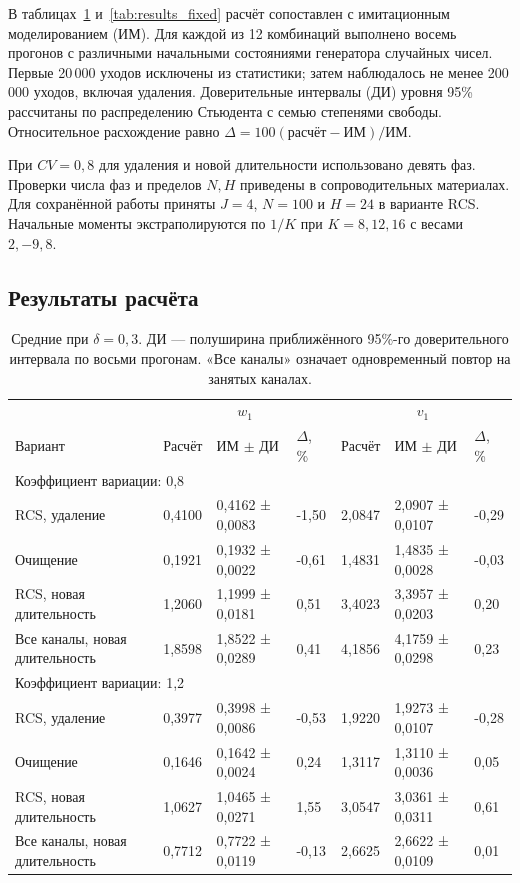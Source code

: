 \documentclass[a4paper,12pt]{article}
\begin{document}
В таблицах~\ref{tab:results} и~\ref{tab:results_fixed} расчёт сопоставлен с имитационным моделированием (ИМ). Для каждой из 12 комбинаций выполнено восемь прогонов с различными начальными состояниями генератора случайных чисел. Первые 20\,000 уходов исключены из статистики; затем наблюдалось не менее 200\,000 уходов, включая удаления. Доверительные интервалы (ДИ) уровня 95\% рассчитаны по распределению Стьюдента с семью степенями свободы. Относительное расхождение равно \(\Delta=100(\text{расчёт}-\text{ИМ})/\text{ИМ}\).

При \(CV=0{,}8\) для удаления и новой длительности использовано девять фаз. Проверки числа фаз и пределов \(N,H\) приведены в сопроводительных материалах. Для сохранённой работы приняты \(J=4\), \(N=100\) и \(H=24\) в варианте RCS. Начальные моменты экстраполируются по \(1/K\) при \(K=8,12,16\) с весами \(2,-9,8\).

\subsection{Результаты расчёта}
\begin{table}[!htbp]
\centering\small\setlength{\tabcolsep}{2pt}
\begin{tabular}{@{}p{4.16cm}p{1.61cm}p{2.83cm}p{1.28cm}p{1.61cm}p{2.83cm}p{1.28cm}@{}}
\toprule
 & \multicolumn{3}{c}{$w_1$} & \multicolumn{3}{c}{$v_1$} \\
Вариант & Расчёт & ИМ $\pm$ ДИ & $\Delta$, \% & Расчёт & ИМ $\pm$ ДИ & $\Delta$, \% \\
\midrule
\multicolumn{7}{l}{Коэффициент вариации: 0,8} \\
RCS, удаление & 0,4100 & 0,4162 ± 0,0083 & -1,50 & 2,0847 & 2,0907 ± 0,0107 & -0,29 \\
Очищение & 0,1921 & 0,1932 ± 0,0022 & -0,61 & 1,4831 & 1,4835 ± 0,0028 & -0,03 \\
RCS, новая длительность & 1,2060 & 1,1999 ± 0,0181 & 0,51 & 3,4023 & 3,3957 ± 0,0203 & 0,20 \\
Все каналы, новая длительность & 1,8598 & 1,8522 ± 0,0289 & 0,41 & 4,1856 & 4,1759 ± 0,0298 & 0,23 \\
\multicolumn{7}{l}{Коэффициент вариации: 1,2} \\
RCS, удаление & 0,3977 & 0,3998 ± 0,0086 & -0,53 & 1,9220 & 1,9273 ± 0,0107 & -0,28 \\
Очищение & 0,1646 & 0,1642 ± 0,0024 & 0,24 & 1,3117 & 1,3110 ± 0,0036 & 0,05 \\
RCS, новая длительность & 1,0627 & 1,0465 ± 0,0271 & 1,55 & 3,0547 & 3,0361 ± 0,0311 & 0,61 \\
Все каналы, новая длительность & 0,7712 & 0,7722 ± 0,0119 & -0,13 & 2,6625 & 2,6622 ± 0,0109 & 0,01 \\
\bottomrule
\end{tabular}
\caption{Средние при $\delta=0{,}3$. ДИ --- полуширина приближённого 95\%-го доверительного интервала по восьми прогонам. «Все каналы» означает одновременный повтор на занятых каналах.}
\label{tab:results}
\end{table}
\end{document}
